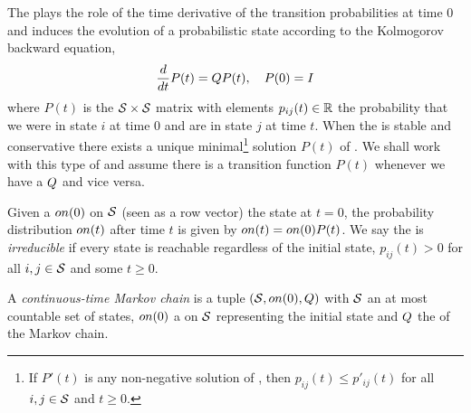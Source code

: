 The \qmatrix plays the role of
the time derivative of the transition probabilities at time $0$
and induces the evolution of a probabilistic state
according to the Kolmogorov backward equation,
\begin{equation}
  \label{eq:transition-function}
  \frac{d}{dt} P(t) = Q P(t), \quad P(0) = I
\end{equation}
where $P(t)$ is the $\mathcal{S} \times \mathcal{S}$ matrix
with elements $p_{ij}(t) \in \mathbb{R}$ the probability that
we were in state $i$ at time $0$ and are in state $j$ at time $t$.
When the \qmatrix is stable and conservative
there exists a unique minimal\footnote{
  If $P'(t)$ is any
  non-negative solution of ,
  then $p_{ij}(t) \leqslant p'_{ij}(t)$
  for all $i, j \in \mathcal{S}$ and $t \geqslant 0$.}
solution $P(t)$ of  \citep{anderson}.
We shall work with this type of \qmatrices
and assume there is a transition function $P(t)$
whenever we have a \qmatrix $Q$ and vice versa.

Given a \pmf $on(0)$ on $\mathcal{S}$ (seen as a row vector)
the state at $t = 0$,
the probability distribution $on(t)$ after time $t$
is given by $on(t) = on(0) P(t)$.
We say the \qmatrix is \emph{irreducible}
if every state is reachable regardless of the initial state,
\ie $p_{ij}(t) > 0$ for all $i,j \in \mathcal{S}$
and some $t \geqslant 0$.

\begin{definition}[CTMC]%
  A \emph{continuous-time Markov chain} is a tuple
  $\left(\mathcal{S}, on(0), Q\right)$ with
  $\mathcal{S}$ an at most countable set of states,
  $on(0)$ a \pmf on $\mathcal{S}$
  representing the initial state and
  $Q$ the \qmatrix of the Markov chain.
\end{definition}

